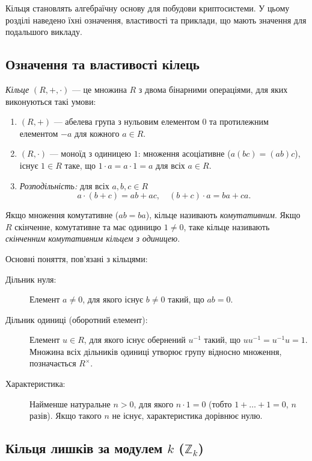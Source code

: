 Кільця становлять алгебраїчну основу для побудови криптосистеми.
У цьому розділі наведено їхні означення, властивості та приклади, що мають значення для подальшого викладу.

\subsection{Означення та властивості кілець}
\label{subsec:ring_definition}

\begin{definition}
    \label{def:ring}
    \emph{Кільце} \((R,+,\cdot)\) — це множина \(R\) з двома бінарними операціями, для яких виконуються такі умови:
    \begin{enumerate}
        \item \((R,+)\) — абелева група з нульовим елементом \(0\) та протилежним елементом \(-a\) для кожного \(a\in R\).
        \item \((R,\cdot)\) — моноїд з одиницею \(1\): множення асоціативне (\(a(bc)=(ab)c\)), існує \(1\in R\) таке, що \(1\cdot a = a\cdot 1 = a\) для всіх \(a\in R\).
        \item \emph{Розподільність:} для всіх \(a,b,c\in R\)
        \[
            a\cdot(b + c) = ab + ac, \quad (b + c)\cdot a = ba + ca.
        \]
    \end{enumerate}
    Якщо множення комутативне (\(ab=ba\)), кільце називають \emph{комутативним}.
    Якщо \(R\) скінченне, комутативне та має одиницю \(1\neq0\), таке кільце називають \emph{скінченним комутативним кільцем з одиницею}.
\end{definition}

Основні поняття, пов'язані з кільцями:
\begin{description}
    \item[Дільник нуля:] Елемент \(a\neq0\), для якого існує \(b\neq0\) такий, що \(ab=0\).
    \item[Дільник одиниці (оборотний елемент):] Елемент \(u\in R\), для якого існує обернений \(u^{-1}\) такий, що \(uu^{-1}=u^{-1}u=1\).
    Множина всіх дільників одиниці утворює групу відносно множення, позначається \(R^\times\).
    \item[Характеристика:] Найменше натуральне \(n>0\), для якого \(n\cdot1 = 0\) (тобто \(1+\dots+1=0\), \(n\) разів).
    Якщо такого \(n\) не існує, характеристика дорівнює нулю.
\end{description}

\subsection{Кільця лишків за модулем \(k\) (\(\mathbb{Z}_k\))}
\label{subsec:residue_rings}

